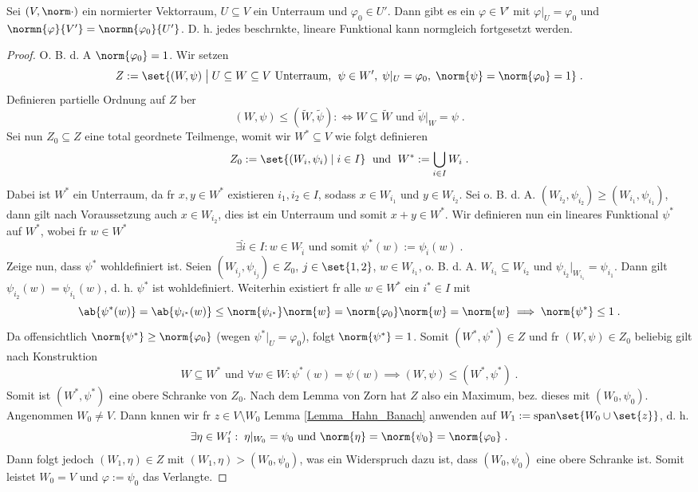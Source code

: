 \begin{theorem}
	Sei \((V,\norm\cdot)\) ein normierter Vektorraum, \(U\subseteq V\) ein Unterraum und \(\varphi_0 \in U'\). Dann gibt es ein \(\varphi \in V'\) mit \(\varphi\vert_U = \varphi_0\) und \(\normn{\varphi}{V'} = \normn{\varphi_0}{U'}\). D. h. jedes beschr\as nkte, lineare Funktional kann normgleich fortgesetzt werden. 
\end{theorem}
\begin{proof}
	O. B. d. A \(\norm{\varphi_0} = 1\). Wir setzen
	\[Z := \set{(W,\psi)\;\big\vert\; U\subseteq W \subseteq V \text{ Unterraum, }\;\psi \in W',\; \psi\vert_U = \varphi_0,\; \norm{\psi} = \norm{\varphi_0} = 1}\;.\]
	Definieren partielle Ordnung auf $Z$ \us ber
	\[(W,\psi) \leq (\tilde W, \tilde \psi) : \iff W \subseteq \tilde W \text{ und } \tilde\psi \vert_W = \psi\;.\]
	Sei nun $Z_0\subseteq Z$ eine total geordnete Teilmenge, womit wir $W^*\subseteq V$ wie folgt definieren
	\[Z_0 := \set{(W_i,\psi_i)\;\vert\; i \in I}\;\text{ und }\; W^* := \bigcup_{i\in I} W_i\;.\]
	Dabei ist $W^*$ ein Unterraum, da f\us r \(x,y \in W^*\) existieren \(i_1, i_2 \in I\), sodass \(x \in W_{i_1}\) und \(y\in W_{i_2}\). Sei o. B. d. A. \((W_{i_2}, \psi_{i_2}) \geq (W_{i_1}, \psi_{i_1})\), dann gilt nach Voraussetzung auch \(x\in W_{i_2}\), dies ist ein Unterraum und somit \(x+y \in W^*\). Wir definieren nun ein lineares Funktional \(\psi^*\) auf \(W^*\), wobei f\us r \(w \in W^*\)
	\[ \exists \hat i\in I: w \in W_{\hat i} \text{ und somit }\psi^*(w) := \psi_{\hat i}(w)\;.\]
	Zeige nun, dass \(\psi^*\) wohldefiniert ist. Seien \((W_{i_j}, \psi_{i_j})\in Z_0\), \(j\in\set{1,2}\), \(w\in W_{i_1}\), o. B. d. A. \(W_{i_1}\subseteq W_{i_2}\) und \(\psi_{i_2}\vert_{W_{i_1}} = \psi_{i_1}\). Dann gilt \(\psi_{i_2}(w) = \psi_{i_1}(w)\), d. h. 
	\(\psi^*\) ist wohldefiniert. Weiterhin existiert f\us r alle \(w\in W^*\) ein \(i^* \in I \) mit 
	\[\ab{\psi^*(w)} = \ab{\psi_{i^*}(w)} \leq \norm{\psi_{i^*}}\norm{w} = \norm{\varphi_0} \norm{w} = \norm{w} \implies \norm{\psi^*} \leq 1\;.\]
	Da offensichtlich \(\norm{\psi^*} \geq \norm{\varphi_0}\) (wegen \(\psi^*\vert_U = \varphi_0\)), folgt \(\norm{\psi^*} = 1\).
	Somit \((W^*, \psi^*)\in Z\) und f\us r \((W,\psi) \in Z_0\) beliebig gilt nach Konstruktion 
	\[W \subseteq W^* \text{ und } \forall w \in W: \psi^*(w) = \psi(w) \implies (W,\psi) \leq (W^*, \psi^*)\;.\]
	Somit ist \((W^*, \psi^*)\) eine obere Schranke von $Z_0$. Nach dem Lemma von Zorn hat $Z$ also ein Maximum, bez. dieses mit \((W_0,\psi_0)\). Angenommen \(W_0 \neq V\). Dann k\os nnen wir f\us r \(z \in V \setminus W_0\) Lemma \ref{Lemma_Hahn_Banach} anwenden auf \(W_1:= \text{span}\set{W_0\cup\set{z}}\), d. h.
	\[\exists \eta \in W_1' :\; \eta\vert_{W_0} = \psi_0 \text{ und } \norm{\eta} = \norm{\psi_0} = \norm{\varphi_0}\;.\]
	Dann folgt jedoch \((W_1,\eta) \in Z\) mit \((W_1,\eta) > (W_0,\psi_0)\), was ein Widerspruch dazu ist, dass \((W_0, \psi_0)\) eine obere Schranke ist. Somit leistet \(W_0 = V\) und \(\varphi:= \psi_0\) das Verlangte.
\end{proof}
	
